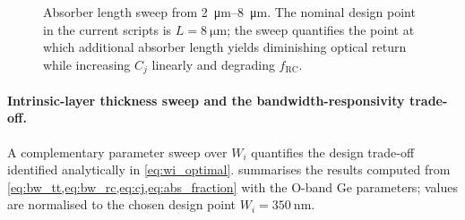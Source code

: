 \begin{figure}[H]
    \centering
    \caption{Absorber length sweep from \SIrange{2}{8}{\micro\metre}.
    The nominal design point in the current scripts is
    $L=\SI{8}{\micro\metre}$; the sweep quantifies the point at which additional
    absorber length yields diminishing optical return while increasing $C_j$
    linearly and degrading $f_{\mathrm{RC}}$.}
    \label{fig:length_sweep}
\end{figure}

\paragraph{Intrinsic-layer thickness sweep and the bandwidth-responsivity trade-off.}
A complementary parameter sweep over $W_i$ quantifies the design trade-off
identified analytically in \cref{eq:wi_optimal}.  summarises
the results computed from \cref{eq:bw_tt,eq:bw_rc,eq:cj,eq:abs_fraction} with
the O-band Ge parameters; values are normalised to the chosen design point
$W_i=\SI{350}{\nano\metre}$.

